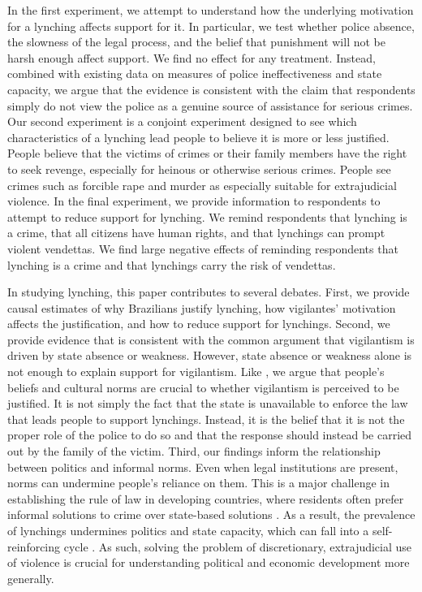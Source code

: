 \documentclass[12pt,ansiapaper]{article}
\begin{document}
In the first experiment, we attempt to understand how the underlying motivation for a lynching affects support for it. In particular, we test whether police absence, the slowness of the legal process, and the belief that punishment will not be harsh enough affect support. We find no effect for any treatment. Instead, combined with existing data on measures of police ineffectiveness and state capacity, we argue that the evidence is consistent with the claim that respondents simply do not view the police as a genuine source of assistance for serious crimes. Our second experiment is a conjoint experiment designed to see which characteristics of a lynching lead people to believe it is more or less justified. People believe that the victims of crimes or their family members have the right to seek revenge, especially for heinous or otherwise serious crimes. People see crimes such as forcible rape and murder as especially suitable for extrajudicial violence. In the final experiment, we provide information to respondents to attempt to reduce support for lynching. We remind respondents that lynching is a crime, that all citizens have human rights, and that lynchings can prompt violent vendettas. We find large negative effects of reminding respondents that lynching is a crime and that lynchings carry the risk of vendettas.

In studying lynching, this  paper contributes to several debates. First, we provide causal estimates of why Brazilians justify lynching, how vigilantes' motivation affects the justification, and how to reduce support for lynchings. Second, we provide evidence that is consistent with the common argument that vigilantism is driven by state absence or weakness. However, state absence or weakness alone is not enough to explain support for vigilantism. Like \cite{jung2020lynching}, we argue that people's beliefs and cultural norms are crucial to whether vigilantism is perceived to be justified. It is not simply the fact that the state is unavailable to enforce the law that leads people to support lynchings. Instead, it is the belief that it is not the proper role of the police to do so and that the response should instead be carried out by the family of the victim. Third, our findings inform the relationship between politics and informal norms. Even when legal institutions are present, norms  can undermine people's reliance on them. This is a major challenge in establishing the rule of law in developing countries, where residents often prefer informal solutions to crime over state-based solutions \citep[10]{blair2020peacekeeping}. As a result, the prevalence of lynchings undermines politics and state capacity, which can fall into a self-reinforcing cycle \citep{jung2020lynching}. As such, solving the problem of discretionary, extrajudicial use of violence is crucial for understanding political and economic development more generally. 
\end{document}
